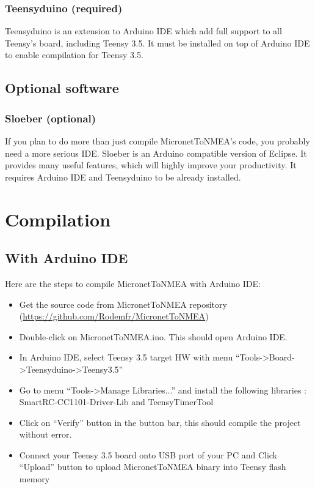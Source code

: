 \documentclass{report}
\begin{document}
\subsection{Teensyduino (required)}

Teensyduino is an extension to Arduino IDE which add full support to all Teensy’s board, including Teensy 3.5. It must be installed on top of Arduino IDE to enable compilation for Teensy 3.5.

\section{Optional software}

\subsection{Sloeber (optional)}

If you plan to do more than just compile MicronetToNMEA’s code, you probably need a more serious IDE. Sloeber is an Arduino compatible version of Eclipse. It provides many useful features, which will highly improve your productivity. It requires Arduino IDE and Teensyduino to be already installed.

\chapter{Compilation}

\section{With Arduino IDE}

Here are the steps to compile MicronetToNMEA with Arduino IDE:

\begin{itemize}
\item Get the source code from MicronetToNMEA repository (\url{https://github.com/Rodemfr/MicronetToNMEA})
\item Double-click on MicronetToNMEA.ino. This should open Arduino IDE.
\item In Arduino IDE, select Teensy 3.5 target HW with menu “Tools->Board->Teensyduino->Teensy3.5”
\item Go to menu “Tools->Manage Libraries...” and install the following libraries : SmartRC-CC1101-Driver-Lib and TeensyTimerTool
\item Click on “Verify” button in the button bar, this should compile the project without error.
\item Connect your Teensy 3.5 board onto USB port of your PC and Click “Upload” button to upload MicronetToNMEA binary into Teensy flash memory
\end{itemize}
\end{document}
